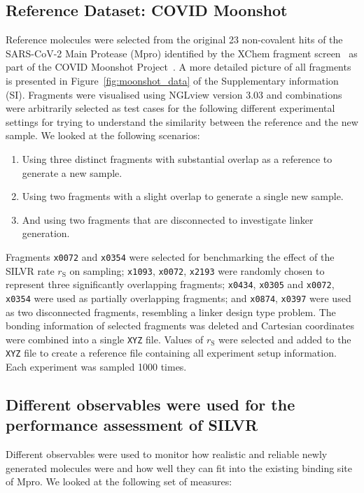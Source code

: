 \documentclass[journal=jacsat,manuscript=article]{achemso}
\begin{document}
\subsection{Reference Dataset: COVID Moonshot}
Reference molecules were selected from the original 23 non-covalent hits of the SARS-CoV-2 Main Protease (Mpro) identified by the XChem fragment screen~\cite{douangamath2020crystallographic} as part of the COVID Moonshot Project~\cite{consortium2023open, consortium2021open}. A more detailed picture of all fragments is presented in Figure~\ref{fig:moonshot_data} of the Supplementary information (SI). Fragments were visualised using NGLview version 3.03 and combinations were arbitrarily selected as test cases for the following different experimental settings for trying to understand the similarity between the reference and the new sample. We looked at the following scenarios:
\begin{enumerate}
    \item Using three distinct fragments with substantial overlap as a reference to generate a new sample.
    \item Using two fragments with a slight overlap to generate a single new sample.
    \item And using two fragments that are disconnected to investigate linker generation.
\end{enumerate}
Fragments \texttt{x0072} and \texttt{x0354} were selected for benchmarking the effect of the SILVR rate $r_{\mathrm{S}}$ on sampling; \texttt{x1093}, \texttt{x0072}, \texttt{x2193} were randomly chosen to represent three significantly overlapping fragments; \texttt{x0434}, \texttt{x0305} and \texttt{x0072}, \texttt{x0354} were used as partially overlapping fragments; and \texttt{x0874}, \texttt{x0397} were used as two disconnected fragments, resembling a linker design type problem. The bonding information of selected fragments was deleted and Cartesian coordinates were combined into a single \texttt{XYZ} file. Values of $r_{\mathrm{S}}$ were selected and added to the \texttt{XYZ} file to create a reference file containing all experiment setup information. Each experiment was sampled 1000 times. 

\subsection{Different observables were used for the performance assessment of SILVR}

Different observables were used to monitor how realistic and reliable newly generated molecules were and how well they can fit into the existing binding site of Mpro. We looked at the following set of measures:
\end{document}
